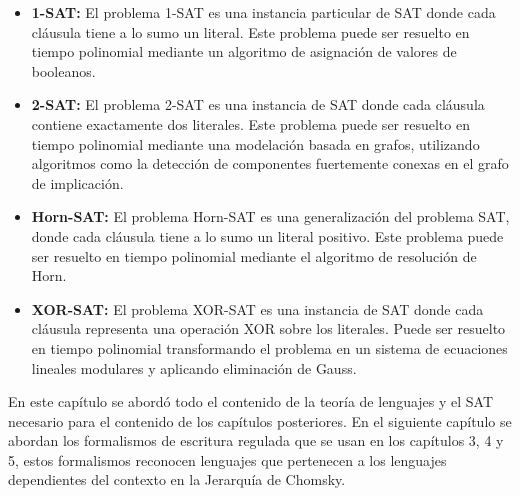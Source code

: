 \documentclass[12pt]{article}
\begin{document}
\begin{itemize}
      \item \textbf{1-SAT:} El problema 1-SAT es una instancia particular de SAT donde cada cláusula tiene a lo sumo un literal.
            Este problema puede ser resuelto en tiempo polinomial mediante un algoritmo de asignación de valores de booleanos.
            
      \item \textbf{2-SAT:} El problema 2-SAT es una instancia de SAT donde cada cláusula contiene exactamente dos literales.
            Este problema puede ser resuelto en tiempo polinomial mediante una modelación basada en grafos, 
            utilizando algoritmos como la detección de componentes fuertemente conexas en el grafo de implicación.
            
      \item \textbf{Horn-SAT:} El problema Horn-SAT es una generalización del problema SAT,
            donde cada cláusula tiene a lo sumo un literal positivo. 
            Este problema puede ser resuelto en tiempo polinomial mediante el algoritmo de resolución de Horn.
            
      \item \textbf{XOR-SAT:} El problema XOR-SAT es una instancia de SAT donde cada cláusula representa una operación XOR
            sobre los literales. Puede ser resuelto en tiempo polinomial transformando el problema en un sistema de ecuaciones 
            lineales modulares y aplicando eliminación de Gauss.
\end{itemize}




En este capítulo se abordó todo el contenido de la teoría de lenguajes y el SAT necesario para el contenido de los capítulos posteriores.
En el siguiente capítulo se abordan los formalismos de escritura regulada que se usan en los capítulos 3, 4 y 5, estos formalismos reconocen lenguajes
que pertenecen a los lenguajes dependientes del contexto en la Jerarquía de Chomsky.
\end{document}

